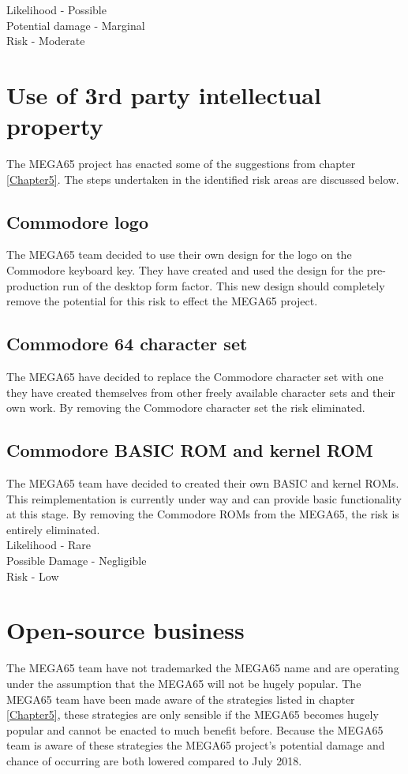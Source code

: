 Likelihood - Possible \\
Potential damage - Marginal \\
Risk - Moderate \\


\section{Use of 3rd party intellectual property}
The MEGA65 project has enacted some of the suggestions from chapter \ref{Chapter5}. The steps undertaken in the identified risk areas are discussed below.

\subsection{Commodore logo}
The MEGA65 team decided to use their own design for the logo on the Commodore keyboard key. They have created and used the design for the pre-production run of the desktop form factor. This new design should completely remove the potential for this risk to effect the MEGA65 project.

\subsection{Commodore 64 character set}
The MEGA65 have decided to replace the Commodore character set with one they have created themselves from other freely available character sets and their own work. By removing the Commodore character set the risk eliminated. 

\subsection{Commodore BASIC ROM and kernel ROM}
The MEGA65 team have decided to created their own BASIC and kernel ROMs. This reimplementation is currently under way and can provide basic functionality at this stage. By removing the Commodore ROMs from the MEGA65, the risk is entirely eliminated. \\

Likelihood - Rare \\
Possible Damage - Negligible \\
Risk - Low \\


\section{Open-source business}
The MEGA65 team have not trademarked the MEGA65 name and are operating under the assumption that the MEGA65 will not be hugely popular. The MEGA65 team have been made aware of the strategies listed in chapter \ref{Chapter5}, these strategies are only sensible if the MEGA65 becomes hugely popular and cannot be enacted to much benefit before. Because the MEGA65 team is aware of these strategies the MEGA65 project's potential damage and chance of occurring are both lowered compared to July 2018. \\

